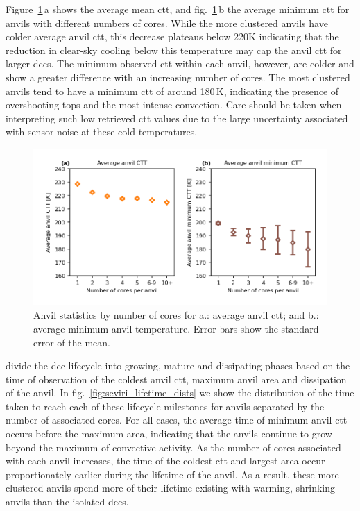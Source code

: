 Figure~\ref{fig:seviri_anvil_ctt_stats}\,a shows the average mean \acrshort{ctt}, and fig.~\ref{fig:seviri_anvil_ctt_stats}\,b the average minimum \acrshort{ctt} for anvils with different numbers of cores. 
While the more clustered anvils have colder average anvil \acrshort{ctt}, this decrease plateaus below 220K indicating that the reduction in clear-sky cooling below this temperature may cap the anvil \acrshort{ctt} for larger \acrshort{dcc}s. 
The minimum observed \acrshort{ctt} within each anvil, however, are colder and show a greater difference with an increasing number of cores. 
The most clustered anvils tend to have a minimum \acrshort{ctt} of around 180\,\unit{K}, indicating the presence of overshooting tops and the most intense convection. 
Care should be taken when interpreting such low retrieved \acrshort{ctt} values due to the large uncertainty associated with sensor noise at these cold temperatures.


\begin{figure}[tp]
    \includegraphics[width=\textwidth]{figures/chapter4_10.png}
    \caption[
    Anvil statistics by number of cores for average anvil \acrshort{ctt} and average minimum anvil temperature
    ]{
    Anvil statistics by number of cores for a.: average anvil \acrshort{ctt}; and b.: average minimum anvil temperature. Error bars show the standard error of the mean.
    }
    \label{fig:seviri_anvil_ctt_stats}
\end{figure}


\citet{futyan_deep_2007} divide the \acrshort{dcc} lifecycle into growing, mature and dissipating phases based on the time of observation of the coldest anvil \acrshort{ctt}, maximum anvil area and dissipation of the anvil. 
In fig.~\ref{fig:seviri_lifetime_dists} we show the distribution of the time taken to reach each of these lifecycle milestones for anvils separated by the number of associated cores. 
For all cases, the average time of minimum anvil \acrshort{ctt} occurs before the maximum area, indicating that the anvils continue to grow beyond the maximum of convective activity. 
As the number of cores associated with each anvil increases, the time of the coldest \acrshort{ctt} and largest area occur proportionately earlier during the lifetime of the anvil. 
As a result, these more clustered anvils spend more of their lifetime existing with warming, shrinking anvils than the isolated \acrshort{dcc}s.


